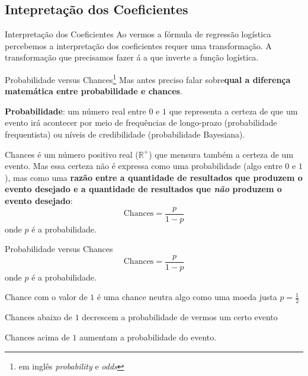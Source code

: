 \subsection{Intepretação dos Coeficientes}
\begin{frame}{Interpretação dos Coeficientes}
    Ao vermos a fórmula de regressão logística percebemos a interpretação dos
    coeficientes requer uma transformação. A transformação que precisamos fazer á a
    que inverte a função logística.
\end{frame}
\begin{frame}{Probabilidade versus Chances\footnote{em inglês \textit{probability} e
    \textit{odds}}}
    \small
    Mas antes preciso falar sobre\textbf{qual a diferença matemática
    entre probabilidade e chances}.
    \begin{vfilleditems}
        \item \small \textbf{Probabilidade}: um número real entre $0$ e $1$ que
        representa a certeza de que um evento irá acontecer por meio de frequências
        de longo-prazo (probabilidade frequentista) ou níveis de credibilidade
        (probabilidade Bayesiana).
        \item \small Chances é um número positivo real ($\mathbb{R}^+$) que mensura
        também a certeza de um evento. Mas essa certeza não é expressa como uma
        probabilidade (algo entre $0$ e $1$), mas como uma \textbf{razão entre a
        quantidade de resultados que produzem o evento desejado e a quantidade de
        resultados que \textit{não} produzem o evento desejado}:
        $$
        \text{Chances} = \frac{p}{1-p}
        $$
        onde $p$ é a probabilidade.
    \end{vfilleditems}
\end{frame}

\begin{frame}{Probabilidade versus Chances}
    $$
    \text{Chances} = \frac{p}{1-p}
    $$
    onde $p$ é a probabilidade.
    \vfill
    \begin{vfilleditems}
        \item Chance com o valor de $1$ é uma chance neutra
        algo como uma moeda justa $p = \frac{1}{2}$
        \item Chances abaixo de $1$ decrescem a probabilidade de vermos um
        certo evento
        \item Chances acima de $1$ aumentam a probabilidade do evento.
    \end{vfilleditems}
\end{frame}

